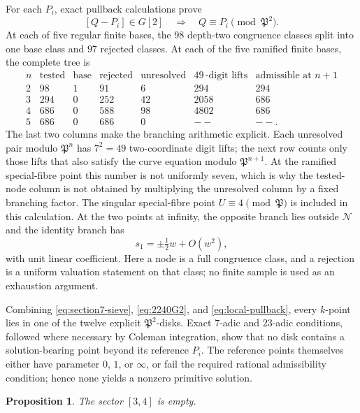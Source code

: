 \documentclass[11pt]{article}
\newcommand{\PP}{\mathfrak P}
\newtheorem{proposition}[theorem]{Proposition}
\theoremstyle{definition}
\theoremstyle{remark}
\begin{document}
For each $P_i$, exact pullback calculations prove
\begin{equation}\label{eq:local-pullback}
 [Q-P_i]\in G[2]\quad\Longrightarrow\quad
                         Q\equiv P_i\pmod{\PP^2}.
\end{equation}
At each of five regular finite bases, the $98$ depth-two congruence classes
split into one base class and $97$ rejected classes.  At each of the five
ramified finite bases, the complete tree is
\[
\begin{array}{c|rrrr|rr}
n&\text{tested}&\text{base}&\text{rejected}&\text{unresolved}
 &49\,\text{-digit lifts}&\text{admissible at }n+1\\ \hline
2&98 &1&91 &6  &294 &294\\
3&294&0&252&42 &2058&686\\
4&686&0&588&98 &4802&686\\
5&686&0&686&0  &--&--.
\end{array}
\]
The last two columns make the branching arithmetic explicit.  Each
unresolved pair modulo $\PP^n$ has $7^2=49$ two-coordinate digit lifts;
the next row counts only those lifts that also satisfy the curve equation
modulo $\PP^{n+1}$.  At the ramified special-fibre point this number is not
uniformly seven, which is why the tested-node column is not obtained by
multiplying the unresolved column by a fixed branching factor.
The singular special-fibre point $U\equiv4\pmod{\PP}$ is included in this
calculation.  At the two points at infinity, the opposite branch lies
outside $\mathcal N$ and the identity branch has
\[
                            s_1=\pm\tfrac12w+O(w^2),
\]
with unit linear coefficient.  Here a node is a full congruence class, and a
rejection is a uniform valuation statement on that class; no finite sample
is used as an exhaustion argument.

Combining \eqref{eq:section7-sieve}, \eqref{eq:2240G2}, and
\eqref{eq:local-pullback}, every $k$-point lies in one of the twelve
explicit $\PP^2$-disks.  Exact $7$-adic and $23$-adic conditions, followed
where necessary by Coleman integration, show that no disk contains a
solution-bearing point beyond its reference $P_i$.  The reference points
themselves either have parameter $0$, $1$, or $\infty$, or fail the required
rational admissibility condition; hence none yields a nonzero primitive
solution.

\begin{proposition}\label{prop:quartic-sector}
The sector $[3,4]$ is empty.
\end{proposition}
\end{document}
